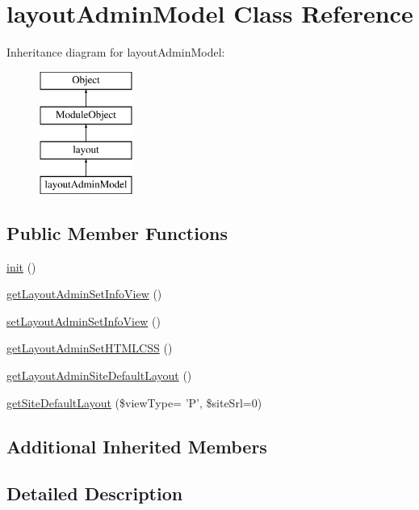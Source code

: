 \hypertarget{classlayoutAdminModel}{\section{layout\-Admin\-Model Class Reference}
\label{classlayoutAdminModel}
}
Inheritance diagram for layout\-Admin\-Model\-:\begin{figure}[H]
\begin{center}
\leavevmode
\includegraphics[height=4.000000cm]{classlayoutAdminModel}
\end{center}
\end{figure}
\subsection*{Public Member Functions}
\begin{DoxyCompactItemize}
\item 
\hyperlink{classlayoutAdminModel_aeb0c45993a600a2e3f72bd0a79c3adc7}{init} ()
\item 
\hyperlink{classlayoutAdminModel_a7171578a8c44846e96b6330378152ddd}{get\-Layout\-Admin\-Set\-Info\-View} ()
\item 
\hyperlink{classlayoutAdminModel_a5d53a19d62ff5fcbd2cc604e3d6a8e29}{set\-Layout\-Admin\-Set\-Info\-View} ()
\item 
\hyperlink{classlayoutAdminModel_a5757eaff4093fe8a359b4f3b5a6a2bff}{get\-Layout\-Admin\-Set\-H\-T\-M\-L\-C\-S\-S} ()
\item 
\hyperlink{classlayoutAdminModel_a1fb703fe8ebe3ced1f904d3a1d645532}{get\-Layout\-Admin\-Site\-Default\-Layout} ()
\item 
\hyperlink{classlayoutAdminModel_af2e53398a6068a4652567b922dfce4b1}{get\-Site\-Default\-Layout} (\$view\-Type= 'P', \$site\-Srl=0)
\end{DoxyCompactItemize}
\subsection*{Additional Inherited Members}


\subsection{Detailed Description}


